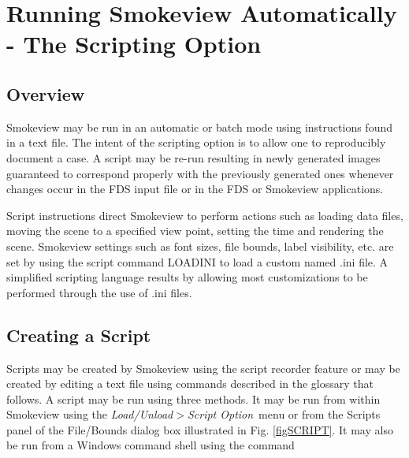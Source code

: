 \documentclass[11pt,twoside]{book}
\begin{document}

\chapter{Running Smokeview Automatically - The Scripting Option}
\label{chapter:scripting}
\section{Overview}
Smokeview may be run in an automatic or batch mode using
instructions found in a text file.
The intent of the scripting option is to allow one to reproducibly document a case.
A script may be re-run resulting in newly generated images guaranteed
to correspond properly with the previously generated
ones whenever changes occur in the FDS input file or in the FDS or Smokeview applications.

Script instructions direct Smokeview to perform actions such as
loading data files, moving the scene to a specified view point,
setting the time and rendering the scene.
Smokeview settings such as font sizes, file bounds, label visibility,
etc. are set by using the script command LOADINI to load a custom named .ini file.
A simplified scripting language results by allowing
most customizations to be performed through the use of .ini files.


\section{Creating a Script}
Scripts may be created by Smokeview using the script recorder
feature or may be created by editing a text file using commands
described in the glossary that follows. A script may be run using
three methods.  It may be run from within Smokeview using the {\em
Load/Unload$>$Script Option}\ menu or from the Scripts panel of
the File/Bounds dialog box illustrated in Fig.
\ref{figSCRIPT}. It may also be run from a Windows command shell
using the command
\end{document}
